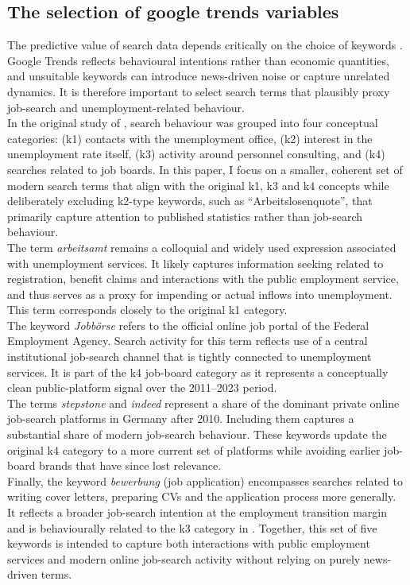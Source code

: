 \documentclass[12pt,a4paper]{article}
\begin{document}
\subsection{The selection of google trends variables}
The predictive value of search data depends critically on the choice of keywords \citep{varian}. 
Google Trends reflects behavioural intentions rather than economic quantities, 
and unsuitable keywords can introduce news-driven noise or capture unrelated dynamics. 
It is therefore important to select search terms that plausibly proxy job-search and unemployment-related behaviour. \\
In the original study of \citet{Askitas}, search behaviour was grouped into four conceptual categories: (k1) contacts with the unemployment office, (k2) interest in the unemployment rate itself, (k3) activity around personnel consulting, and (k4) searches related to job boards. In this paper, I focus on a smaller, coherent set of modern search terms that align with the original k1, k3 and k4 concepts while deliberately excluding k2-type keywords, such as “Arbeitslosenquote”, that primarily capture attention to published statistics rather than job-search behaviour.\\
The term \textit{arbeitsamt} remains a colloquial and widely used expression associated with unemployment services. It likely captures information seeking related to registration, benefit claims and interactions with the public employment service, and thus serves as a proxy for impending or actual inflows into unemployment. This term corresponds closely to the original k1 category.\\
The keyword \textit{Jobbörse} refers to the official online job portal of the Federal Employment Agency. Search activity for this term reflects use of a central institutional job-search channel that is tightly connected to unemployment services. It is part of the k4 job-board category as it represents a conceptually clean public-platform signal over the 2011--2023 period.\\
The terms \textit{stepstone} and \textit{indeed} represent a share of the dominant private online job-search platforms in Germany after 2010. Including them captures a substantial share of modern job-search behaviour. These keywords update the original k4 category to a more current set of platforms while avoiding earlier job-board brands that have since lost relevance.\\
Finally, the keyword \textit{bewerbung} (job application) encompasses searches related to writing cover letters, preparing CVs and the application process more generally. It reflects a broader job-search intention at the employment transition margin and is behaviourally related to the k3 category in \citet{Askitas}. Together, this set of five keywords is intended to capture both interactions with public employment services and modern online job-search activity without relying on purely news-driven terms.
\end{document}
